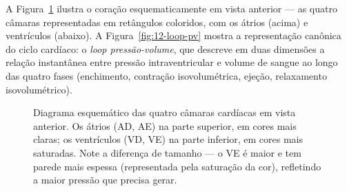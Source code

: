A Figura~\ref{fig:12-camaras} ilustra o coração esquematicamente em
vista anterior --- as quatro câmaras representadas em retângulos
coloridos, com os átrios (acima) e ventrículos (abaixo). A
Figura~\ref{fig:12-loop-pv} mostra a representação canônica do
ciclo cardíaco: o \emph{loop pressão-volume}, que descreve em duas
dimensões a relação instantânea entre pressão intraventricular e
volume de sangue ao longo das quatro fases (enchimento, contração
isovolumétrica, ejeção, relaxamento isovolumétrico).

\begin{figure}[htbp]
\centering
{}
\caption{Diagrama esquemático das quatro câmaras cardíacas em vista anterior. Os átrios (AD, AE) na parte superior, em cores mais claras; os ventrículos (VD, VE) na parte inferior, em cores mais saturadas. Note a diferença de tamanho --- o VE é maior e tem parede mais espessa (representada pela saturação da cor), refletindo a maior pressão que precisa gerar.}
\label{fig:12-camaras}
\end{figure}

